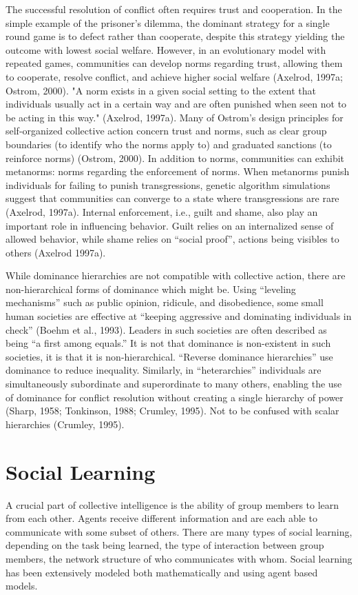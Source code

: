 The successful resolution of conflict often requires trust and cooperation. In the simple example of the prisoner's dilemma, the dominant strategy for a single round game is to defect rather than cooperate, despite this strategy yielding the outcome with lowest social welfare. However, in an evolutionary model with repeated games, communities can develop norms regarding trust, allowing them to cooperate, resolve conflict, and achieve higher social welfare (Axelrod, 1997a; Ostrom, 2000). "A norm exists in a given social setting to the extent that individuals usually act in a certain way and are often punished when seen not to be acting in this way." (Axelrod, 1997a). Many of Ostrom's design principles for self-organized collective action concern trust and norms, such as clear group boundaries (to identify who the norms apply to) and graduated sanctions (to reinforce norms) (Ostrom, 2000). In addition to norms, communities can exhibit metanorms: norms regarding the enforcement of norms. When metanorms punish individuals for failing to punish transgressions, genetic algorithm simulations suggest that communities can converge to a state where transgressions are rare (Axelrod, 1997a). Internal enforcement, i.e., guilt and shame, also play an important role in influencing behavior. Guilt relies on an internalized sense of allowed behavior, while shame relies on ``social proof'', actions being visibles to others (Axelrod 1997a).

While dominance hierarchies are not compatible with collective action, there are non-hierarchical forms of dominance which might be. Using ``leveling mechanisms'' such as public opinion, ridicule, and disobedience, some small human societies are effective at ``keeping aggressive and dominating individuals in check'' (Boehm et al., 1993). Leaders in such societies are often described as being ``a first among equals.'' It is not that dominance is non-existent in such societies, it is that it is non-hierarchical. ``Reverse dominance hierarchies'' use dominance to reduce inequality. Similarly, in ``heterarchies'' individuals are simultaneously subordinate and superordinate to many others, enabling the use of dominance for conflict resolution without creating a single hierarchy of power (Sharp, 1958; Tonkinson, 1988; Crumley, 1995). Not to be confused with scalar hierarchies (Crumley, 1995).

\section{Social Learning}
A crucial part of collective intelligence is the ability of group members to learn from each other. Agents receive different information and are each able to communicate with some subset of others. There are many types of social learning, depending on the task being learned, the type of interaction between group members, the network structure of who communicates with whom. Social learning has been extensively modeled both mathematically and using agent based models.

